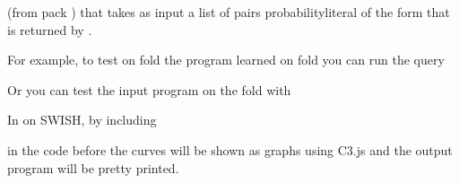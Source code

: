 \documentclass[letterpaper,10pt,english]{sphinxmanual}
\begin{document}
\sphinxAtStartPar
(from pack ) that takes as input a list  of pairs probability\sphinxhyphen{}literal of the form that is returned by .

\sphinxAtStartPar
For example, to test on fold  the program learned on fold  you can run the query

\begin{sphinxVerbatim}[commandchars=\\\{\}]
 \PYG{p}{[}\PYG{p}{]}
\PYG{p}{[}\PYG{p}{]}
\end{sphinxVerbatim}

\sphinxAtStartPar
Or you can test the input program on the fold  with

\begin{sphinxVerbatim}[commandchars=\\\{\}]
 \PYG{p}{[}\PYG{p}{]}
\end{sphinxVerbatim}

\sphinxAtStartPar
In  on SWISH, by including

\begin{sphinxVerbatim}[commandchars=\\\{\}]
 
 
\end{sphinxVerbatim}

\sphinxAtStartPar
in the code before  the curves will be shown as graphs using C3.js and the output program will be pretty printed.
\end{document}
